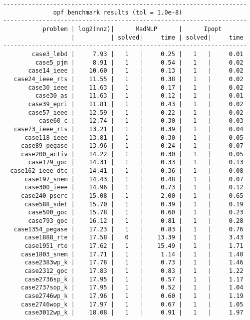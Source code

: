 \begin{verbatim}
--------------------------------------------------------------------
              opf benchmark results (tol = 1.0e-8)
--------------------------------------------------------------------
           problem | log2(nnz)|      MadNLP      |      Ipopt        
                   |          | solved|     time | solved|     time     
--------------------------------------------------------------------
        case3_lmbd |     7.93 |   1   |     0.25 |   1   |     0.01
         case5_pjm |     8.91 |   1   |     0.54 |   1   |     0.02
       case14_ieee |    10.60 |   1   |     0.13 |   1   |     0.02
   case24_ieee_rts |    11.55 |   1   |     0.38 |   1   |     0.02
       case30_ieee |    11.63 |   1   |     0.17 |   1   |     0.02
         case30_as |    11.63 |   1   |     0.12 |   1   |     0.01
       case39_epri |    11.81 |   1   |     0.43 |   1   |     0.02
       case57_ieee |    12.59 |   1   |     0.22 |   1   |     0.02
          case60_c |    12.74 |   1   |     0.30 |   1   |     0.03
   case73_ieee_rts |    13.21 |   1   |     0.39 |   1   |     0.04
      case118_ieee |    13.81 |   1   |     0.30 |   1   |     0.05
     case89_pegase |    13.96 |   1   |     0.24 |   1   |     0.07
     case200_activ |    14.22 |   1   |     0.30 |   1   |     0.05
       case179_goc |    14.31 |   1   |     0.33 |   1   |     0.13
  case162_ieee_dtc |    14.41 |   1   |     0.36 |   1   |     0.08
      case197_snem |    14.43 |   1   |     0.48 |   1   |     0.07
      case300_ieee |    14.96 |   1   |     0.73 |   1   |     0.12
     case240_pserc |    15.08 |   1   |     2.00 |   1   |     0.65
      case588_sdet |    15.70 |   1   |     0.39 |   1   |     0.19
       case500_goc |    15.78 |   1   |     0.60 |   1   |     0.23
       case793_goc |    16.12 |   1   |     0.81 |   1   |     0.28
   case1354_pegase |    17.23 |   1   |     0.83 |   1   |     0.76
      case1888_rte |    17.58 |   0   |    13.39 |   1   |     3.43
      case1951_rte |    17.62 |   1   |    15.49 |   1   |     1.71
     case1803_snem |    17.71 |   1   |     1.14 |   1   |     1.40
      case2383wp_k |    17.78 |   1   |     0.73 |   1   |     1.46
      case2312_goc |    17.83 |   1   |     0.83 |   1   |     1.22
      case2736sp_k |    17.95 |   1   |     0.57 |   1   |     1.17
     case2737sop_k |    17.95 |   1   |     0.52 |   1   |     1.04
      case2746wp_k |    17.96 |   1   |     0.60 |   1   |     1.19
     case2746wop_k |    17.97 |   1   |     0.67 |   1   |     1.05
      case3012wp_k |    18.08 |   1   |     0.91 |   1   |     1.97

\end{verbatim}
